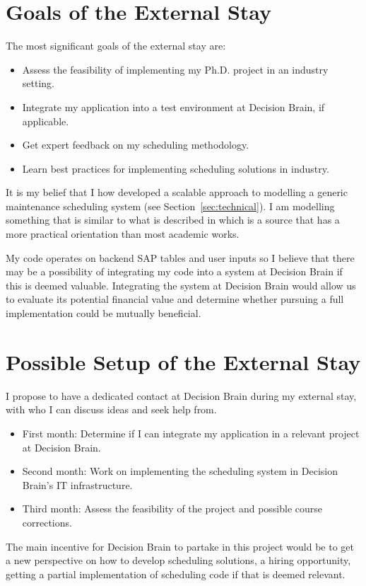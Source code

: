 \section*{Goals of the External Stay}
The most significant goals of the external stay are:

\begin{itemize}
	\item Assess the feasibility of implementing my Ph.D. project in an industry setting.
	\item Integrate my application into a test environment at Decision Brain, if applicable.
	\item Get expert feedback on my scheduling methodology. 
	\item Learn best practices for implementing scheduling solutions in industry.
\end{itemize}

It is my belief that I how developed a scalable approach to modelling a generic 
maintenance scheduling system (see Section~\ref{sec:technical}). I am 
modelling something that is similar to what is described in \citet{palmerMaintenancePlanningScheduling2019} 
which is a source that has a more practical orientation than most academic works. 

My code operates on backend SAP tables and user inputs so I believe that there may be a possibility of integrating my 
code into a system at Decision Brain if this is deemed valuable. Integrating the system at Decision 
Brain would allow us to evaluate its potential financial value and determine whether pursuing a
full implementation could be mutually beneficial.

\newpage
\section*{Possible Setup of the External Stay}
I propose to have a dedicated contact at Decision Brain during my external stay, with who I can discuss ideas and seek help from.

\begin{itemize}
	\item First month: Determine if I can integrate my application in a relevant project at Decision Brain.
	\item Second month: Work on implementing the scheduling system in Decision Brain's IT infrastructure.
	\item Third month: Assess the feasibility of the project and possible course corrections.
\end{itemize}

The main incentive for Decision Brain to partake in this project would be to get a new perspective on how to develop scheduling solutions,
a hiring opportunity, getting a partial implementation of scheduling code if that is deemed relevant.

